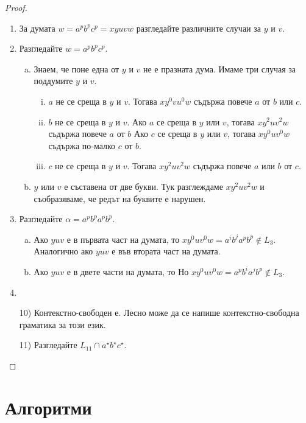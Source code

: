 \begin{proof}
  \begin{enumerate}[1)]
  \item
    За думата $w = a^pb^pc^p = xyuvw$ разгледайте различните случаи за $y$ и $v$.
  \item
    Разгледайте $w = a^pb^pc^p$.
    \begin{enumerate}[a)]
    \item
      Знаем, че поне една от $y$ и $v$ не е празната дума.
      Имаме три случая за поддумите $y$ и $v$.
      \begin{enumerate}[i)]
      \item
        $a$ не се среща в $y$ и $v$.
        Тогава $xy^0vu^0w$ съдържа повече $a$ от $b$ или $c$.
      \item
        $b$ не се среща в $y$ и $v$.
        Ако $a$ се среща в $y$ или $v$, тогава $xy^2uv^2w$ съдържа повече $a$ от $b$
        Ако $c$ се среща в $y$ или $v$, тогава $xy^0uv^0w$ съдържа по-малко $c$ от $b$.
      \item
        $c$ не се среща в $y$ и $v$.
        Тогава $xy^2uv^2w$ съдържа повече $a$ или $b$ от $c$.
      \end{enumerate}      
    \item
      $y$ или $v$ е съставена от две букви.
      Тук разглеждаме $xy^2uv^2w$ и съобразяваме, че редът на буквите е нарушен.
    \end{enumerate}
  \item
    Разгледайте $\alpha = a^pb^pa^pb^p$.
    \begin{enumerate}[a)]
    \item
      Ако $yuv$ е в първата част на думата, то 
      $xy^0uv^0w = a^ib^ja^pb^p \not\in L_3$.
      Аналогично ако $yuv$ е във втората част на думата.
    \item
      Ако $yuv$ е в двете части на думата, то 
      Но $xy^0uv^0w = a^pb^ia^jb^p \not\in L_3$.
    \end{enumerate}
  \item
  \item[10)]
    Контекстно-свободен е. Лесно може да се напише контекстно-свободна граматика за този език.
  \item[11)]
    Разгледайте $L_{11} \cap a^\star b^\star c^\star$.
  \end{enumerate}
\end{proof}


\section{Алгоритми}

